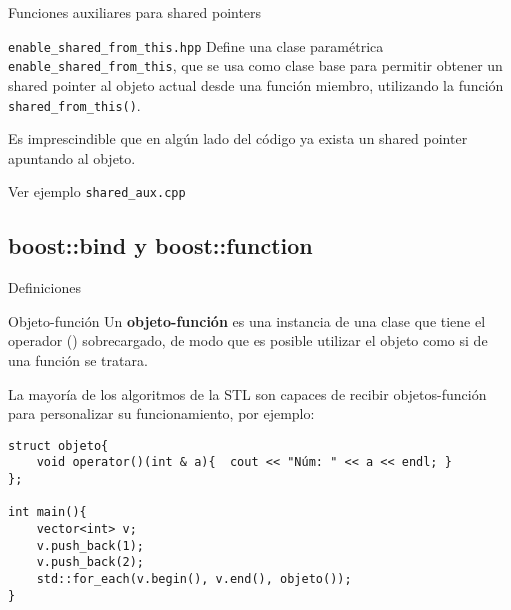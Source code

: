 \documentclass[8pt,xcolor=svgnames]{beamer}
\begin{document}
\begin{frame}[fragile]{Funciones auxiliares para shared pointers}
\begin{block}{\texttt{enable\_shared\_from\_this.hpp}}
  Define una clase paramétrica \texttt{enable\_shared\_from\_this},
  que se usa como clase base para permitir obtener un shared pointer
  al objeto actual desde una función miembro, utilizando la función
  \texttt{shared\_from\_this()}.

  \medskip

  Es imprescindible que en algún lado del código ya exista un shared
  pointer apuntando al objeto.    
  \end{block}

  \begin{block}{}
    Ver ejemplo \texttt{shared\_aux.cpp}
  \end{block}
\end{frame}

\subsection{boost::bind y boost::function}
\begin{frame}[fragile]{Definiciones}
  \begin{block}{Objeto-función}
    Un \textbf{objeto-función} es una instancia de una clase que tiene
    el operador () sobrecargado, de modo que es posible utilizar el
    objeto como si de una función se tratara.

    \medskip

    La mayoría de los algoritmos de la STL son capaces de recibir
    objetos-función para personalizar su funcionamiento, por ejemplo:
{\small
\begin{verbatim}
struct objeto{
    void operator()(int & a){  cout << "Núm: " << a << endl; }
};

int main(){
    vector<int> v;  
    v.push_back(1);  
    v.push_back(2);
    std::for_each(v.begin(), v.end(), objeto());
}
\end{verbatim}
}
  \end{block}
\end{frame}
\end{document}
